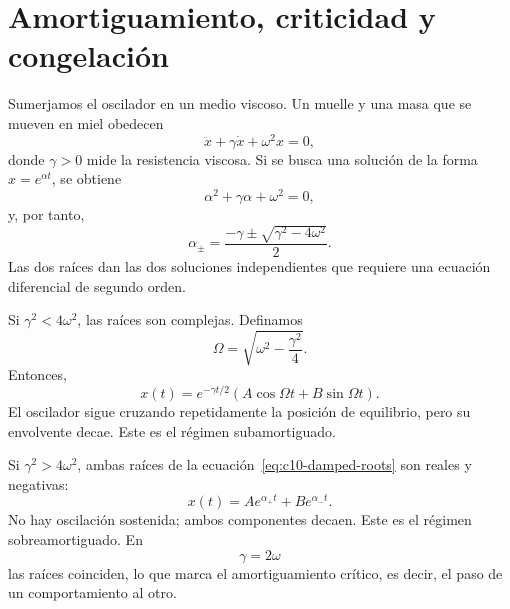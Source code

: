 \section{Amortiguamiento, criticidad y congelación}

Sumerjamos el oscilador en un medio viscoso. Un muelle y una masa que se mueven en miel obedecen
\begin{equation}
\ddot x+\gamma\dot x+\omega^2x=0,
\label{eq:c10-damped}
\end{equation}
donde \(\gamma>0\) mide la resistencia viscosa. Si se busca una solución de la forma \(x=e^{\alpha t}\), se obtiene
\begin{equation}
\alpha^2+\gamma\alpha+\omega^2=0,
\end{equation}
y, por tanto,
\begin{equation}
\alpha_\pm
=\frac{-\gamma\pm\sqrt{\gamma^2-4\omega^2}}{2}.
\label{eq:c10-damped-roots}
\end{equation}
Las dos raíces dan las dos soluciones independientes que requiere una ecuación diferencial de segundo orden.

\begin{classroomqa}
\end{classroomqa}

Si \(\gamma^2<4\omega^2\), las raíces son complejas. Definamos
\[
\Omega=\sqrt{\omega^2-\frac{\gamma^2}{4}}.
\]
Entonces,
\begin{equation}
x(t)=e^{-\gamma t/2}
\left(A\cos\Omega t+B\sin\Omega t\right).
\label{eq:c10-underdamped}
\end{equation}
El oscilador sigue cruzando repetidamente la posición de equilibrio, pero su envolvente decae. Este es el régimen subamortiguado.

Si \(\gamma^2>4\omega^2\), ambas raíces de la ecuación~\eqref{eq:c10-damped-roots} son reales y negativas:
\begin{equation}
x(t)=A e^{\alpha_+t}+B e^{\alpha_-t}.
\label{eq:c10-overdamped}
\end{equation}
No hay oscilación sostenida; ambos componentes decaen. Este es el régimen sobreamortiguado. En
\begin{equation}
\gamma=2\omega
\label{eq:c10-critical}
\end{equation}
las raíces coinciden, lo que marca el amortiguamiento crítico, es decir, el paso de un comportamiento al otro.

